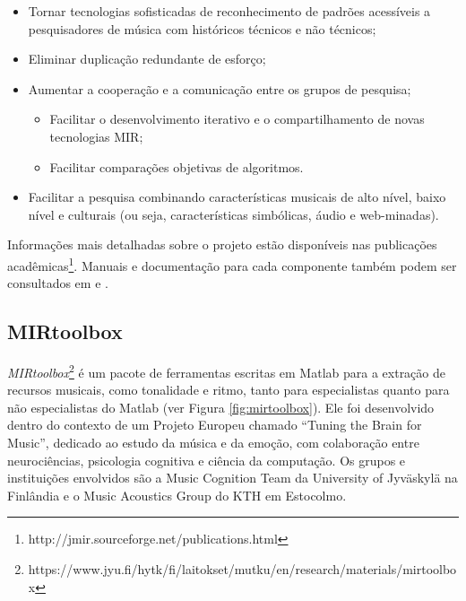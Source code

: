 \begin{itemize}
    \item Tornar tecnologias sofisticadas de reconhecimento de padrões acessíveis a pesquisadores de música com históricos técnicos e não técnicos;
    \item Eliminar duplicação redundante de esforço;
    \item Aumentar a cooperação e a comunicação entre os grupos de pesquisa;
    \begin{itemize}
        \item Facilitar o desenvolvimento iterativo e o compartilhamento de novas tecnologias MIR;
        \item Facilitar comparações objetivas de algoritmos.
    \end{itemize}
    \item Facilitar a pesquisa combinando características musicais de alto nível, baixo nível e culturais (ou seja, características simbólicas, áudio e web-minadas).
\end{itemize}

Informações mais detalhadas sobre o projeto estão disponíveis nas publicações acadêmicas\footnote{http://jmir.sourceforge.net/publications.html}. Manuais e documentação para cada componente também podem ser consultados em \cite{jmir} e \cite{mckay2010}.


\subsection{MIRtoolbox} \label{subsec:mirtoolbox}
\textit{MIRtoolbox}\footnote{https://www.jyu.fi/hytk/fi/laitokset/mutku/en/research/materials/mirtoolbox} é um pacote de ferramentas escritas em Matlab para a extração de recursos musicais, como tonalidade e ritmo, tanto para especialistas quanto para não especialistas do Matlab (ver Figura \ref{fig:mirtoolbox}). Ele foi desenvolvido dentro do contexto de um Projeto Europeu chamado “Tuning the Brain for Music”, dedicado ao estudo da música e da emoção, com colaboração entre neurociências, psicologia cognitiva e ciência da computação. Os grupos e instituições envolvidos são a Music Cognition Team da University of Jyväskylä na Finlândia e o Music Acoustics Group do KTH em Estocolmo.

